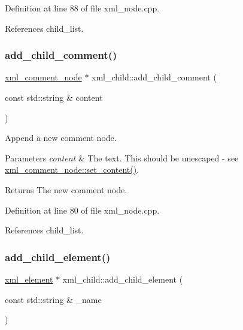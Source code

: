 Definition at line 88 of file xml\+\_\+node.\+cpp.



References child\+\_\+list.

\mbox{\label{classxml__child_aaae026d29c248b85de947ba6e86dca12}} 
\subsubsection{\texorpdfstring{add\+\_\+child\+\_\+comment()}{add\_child\_comment()}}
{\footnotesize\ttfamily \hyperlink{classxml__comment__node}{xml\+\_\+comment\+\_\+node} $\ast$ xml\+\_\+child\+::add\+\_\+child\+\_\+comment (\begin{DoxyParamCaption}\item[{const std\+::string \&}]{content }\end{DoxyParamCaption})}



Append a new comment node. 


\begin{DoxyParams}{Parameters}
{\em content} & The text. This should be unescaped -\/ see \hyperlink{classxml__comment__node_a4f34eb5787506cbfb784fb7c5f927423}{xml\+\_\+comment\+\_\+node\+::set\+\_\+content()}. \\
\hline
\end{DoxyParams}
\begin{DoxyReturn}{Returns}
The new comment node. 
\end{DoxyReturn}


Definition at line 80 of file xml\+\_\+node.\+cpp.



References child\+\_\+list.

\mbox{\label{classxml__child_a07932d44513704bb21e12bd693fc917e}} 
\subsubsection{\texorpdfstring{add\+\_\+child\+\_\+element()}{add\_child\_element()}\hspace{0.1cm}{\footnotesize\ttfamily [1/2]}}
{\footnotesize\ttfamily \hyperlink{classxml__element}{xml\+\_\+element} $\ast$ xml\+\_\+child\+::add\+\_\+child\+\_\+element (\begin{DoxyParamCaption}\item[{const std\+::string \&}]{\+\_\+name }\end{DoxyParamCaption})}




